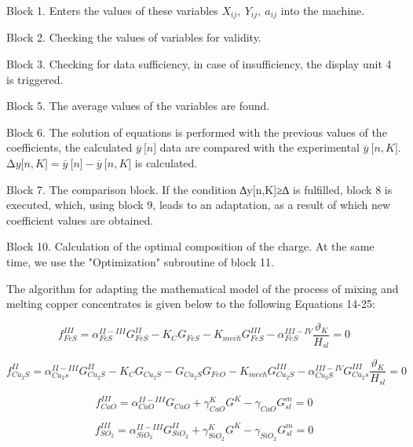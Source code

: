 \begin{noparindent}
Block 1. Enters the values of these variables
\(X_{ij},\ Y_{ij},\ a_{ij}\) into the machine.

Block 2. Checking the values of variables for validity.

Block 3. Checking for data sufficiency, in case of insufficiency, the
display unit 4 is triggered.

Block 5. The average values of the variables are found.

Block 6. The solution of equations is performed with the previous values
of the coefficients, the calculated \(\overline{y}\ \lbrack n\rbrack\)
data are compared with the experimental
\(\overline{y}\ \lbrack n,K\rbrack\).
\(\mathrm{\Delta}y\lbrack n,K\rbrack = \overline{y}\ \lbrack n\rbrack - \overline{y}\ \lbrack n,K\rbrack\)
is calculated.

Block 7. The comparison block. If the condition
\textbar∆y{[}n,K{]}\textbar≥∆ is fulfilled, block 8 is executed, which,
using block 9, leads to an adaptation, as a result of which new
coefficient values are obtained.

Block 10. Calculation of the optimal composition of the charge. At the
same time, we use the "Optimization" subroutine of block 11.
\end{noparindent}

The algorithm for adapting the mathematical model of the process of
mixing and melting copper concentrates is given below to the following
Equations 14-25:

\begin{equation}
f_{FeS}^{III} = \alpha_{FeS}^{II - III}G_{FeS}^{II} - K_{C}G_{FeS} - K_{mech}G_{FeS}^{III} - \alpha_{FeS}^{III - IV}\frac{\vartheta_{K}}{H_{sl}} = 0
\end{equation}

\begin{equation}
f_{Cu_{2}S}^{II} = \alpha_{Cu_{2}s}^{II - III}G_{Cu_{2}S}^{II} - K_{C}G_{Cu_{2}S} - G_{Cu_{2}S}G_{FeO} - K_{mech}G_{Cu_{2}S}^{III} - \alpha_{Cu_{2}S}^{III - IV}G_{Cu_{2}s}^{III}\frac{\vartheta_{K}}{H_{sl}} = 0
\end{equation}

\begin{equation}
f_{CaO}^{III} = \alpha_{CaO}^{II - III}G_{CaO} + \gamma_{CaO}^{K}G^{K} - \gamma_{CaO}G_{sl}^{m} = 0
\end{equation}

\begin{equation}
f_{SO_{2}}^{III} = \alpha_{SiO_{2}}^{II - III}G_{SiO_{2}}^{II} + \gamma_{SiO_{2}}^{K}G^{K} - \gamma_{SiO_{2}}G_{sl}^{m} = 0
\end{equation}

